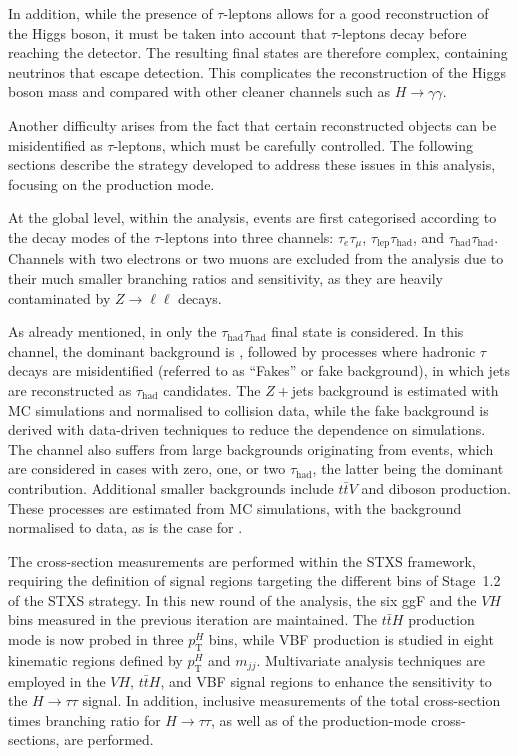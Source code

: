 In addition, while the presence of $\tau$-leptons allows for a good reconstruction of the Higgs boson, it must be taken into account that $\tau$-leptons decay before reaching the detector. The resulting final states are therefore complex, containing neutrinos that escape detection. This complicates the reconstruction of the Higgs boson mass and \pt compared with other cleaner channels such as $H \to \gamma\gamma$.  

Another difficulty arises from the fact that certain reconstructed objects can be misidentified as $\tau$-leptons, which must be carefully controlled. The following sections describe the strategy developed to address these issues in this analysis, focusing on the \ttH production mode. 

At the global level, within the \htautau analysis, events are first categorised according to the decay modes of the $\tau$-leptons into three channels: $\tau_{e}\tau_{\mu}$, $\tau_{\text{lep}}\tau_{\text{had}}$, and $\tau_{\text{had}}\tau_{\text{had}}$. Channels with two electrons or two muons are excluded from the analysis due to their much smaller branching ratios and sensitivity, as they are heavily contaminated by $Z \to \ell\ell$ decays.  

As already mentioned, in \ttHtt only the $\tau_{\text{had}}\tau_{\text{had}}$ final state is considered. In this channel, the dominant background is \ztautau, followed by processes where hadronic $\tau$ decays are misidentified (referred to as ``Fakes'' or fake background), in which jets are reconstructed as $\tau_{\text{had}}$ candidates. The $Z+$jets background is estimated with MC simulations and normalised to collision data, while the fake background is derived with data-driven techniques to reduce the dependence on simulations. The \ttH channel also suffers from large backgrounds originating from \ttbar events, which are considered in cases with zero, one, or two $\tau_{\text{had}}$, the latter being the dominant contribution. Additional smaller backgrounds include $t\bar{t}V$ and diboson production. These processes are estimated from MC simulations, with the \ttbar background normalised to data, as is the case for \ztautau.  

The cross-section measurements are performed within the STXS framework, requiring the definition of signal regions targeting the different bins of Stage~1.2 of the STXS strategy. In this new round of the \htautau analysis, the six ggF and the $VH$ bins measured in the previous iteration are maintained. The $t\bar{t}H$ production mode is now probed in three $p_{\text{T}}^H$ bins, while VBF production is studied in eight kinematic regions defined by $p_{\text{T}}^H$ and $m_{jj}$. Multivariate analysis techniques are employed in the $VH$, $t\bar{t}H$, and VBF signal regions to enhance the sensitivity to the $H \to \tau\tau$ signal. In addition, inclusive measurements of the total cross-section times branching ratio for $H \to \tau\tau$, as well as of the production-mode cross-sections, are performed.  

